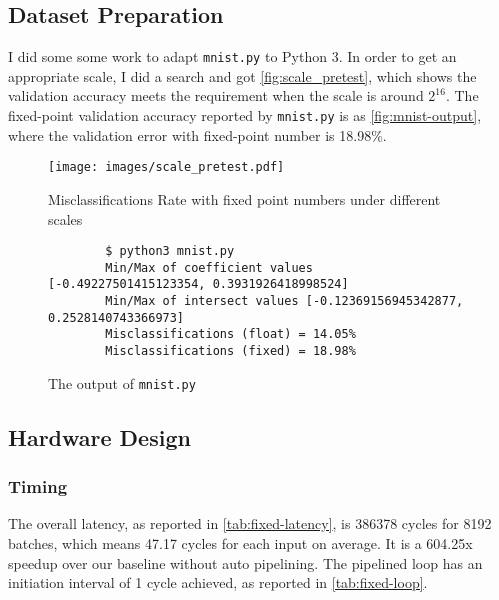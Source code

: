 
\subsection{Dataset Preparation}

I did some some work to adapt \nolinkurl{mnist.py} to Python 3.
In order to get an appropriate scale, I did a search and got \autoref{fig:scale_pretest}, which shows the validation accuracy meets the requirement when the scale is around \(2^{16}\).
The fixed-point validation accuracy reported by \nolinkurl{mnist.py} is as \autoref{fig:mnist-output}, where the validation error with fixed-point number is 18.98\%.

\begin{figure}[ht!]
    \centering
    \texttt{[image: images/scale\_pretest.pdf]}
    \caption{Misclassifications Rate with fixed point numbers under different scales}
    \label{fig:scale_pretest}
\end{figure}

\begin{figure}[ht!]
    \begin{verbatim}
        $ python3 mnist.py
        Min/Max of coefficient values [-0.49227501415123354, 0.3931926418998524]
        Min/Max of intersect values [-0.12369156945342877, 0.2528140743366973]
        Misclassifications (float) = 14.05%
        Misclassifications (fixed) = 18.98%
    \end{verbatim}
    \caption{The output of \nolinkurl{mnist.py}}
    \label{fig:mnist-output}
\end{figure}

\subsection{Hardware Design}

\subsubsection{Timing}

The overall latency, as reported in \autoref{tab:fixed-latency}, is 386378 cycles for 8192 batches, which means 47.17 cycles for each input on average.
It is a 604.25x speedup over our baseline without auto pipelining.
The pipelined loop has an initiation interval of 1 cycle achieved, as reported in \autoref{tab:fixed-loop}.

